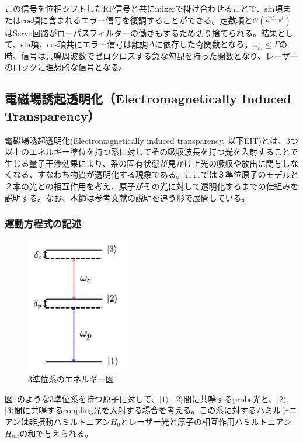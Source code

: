 \documentclass[dvipdfmx]{jsarticle}
\begin{document}
この信号を位相シフトしたRF信号と共にmixerで掛け合わせることで、sin項またはcos項に含まれるエラー信号を復調することができる。定数項と$\mathcal{O}(e^{2i\omega_m t})$はServo回路がローパスフィルターの働きもするため切り捨てられる。結果として、sin項、cos項共にエラー信号は離調$\Delta$に依存した奇関数となる。$\omega_m \leq \Gamma$の時、信号は共鳴周波数でゼロクロスする急な勾配を持った関数となり、レーザーのロックに理想的な信号となる。

\clearpage
\subsection{電磁場誘起透明化（Electromagnetically Induced Transparency）}
電磁場誘起透明化(Electromagnetically induced transparency, 以下EIT)とは、3つ以上のエネルギー準位を持つ系に対してその吸収波長を持つ光を入射することで生じる量子干渉効果により、系の固有状態が見かけ上光の吸収や放出に関与しなくなる、すなわち物質が透明化する現象である。ここでは３準位原子のモデルと２本の光との相互作用を考え、原子がその光に対して透明化するまでの仕組みを説明する。なお、本節は参考文献\cite{eit-pertubation}\cite{eit-absorption}の説明を追う形で展開している。
\subsubsection{運動方程式の記述}
\begin{figure}
\centering
\includegraphics[width=0.4\textwidth]{images/EIT_spectre.png}
\caption{\label{fig:eit-spectre}3準位系のエネルギー図}
\end{figure}

図\ref{fig:eit-spectre}のような3準位系を持つ原子に対して、$| 1 \rangle$, $| 2 \rangle$間に共鳴するprobe光と、$| 2 \rangle$, $| 3 \rangle$間に共鳴するcoupling光を入射する場合を考える。この系に対するハミルトニアンは非摂動ハミルトニアン$H_0$とレーザー光と原子の相互作用ハミルトニアン$H_{int}$の和で与えられる。
\end{document}
